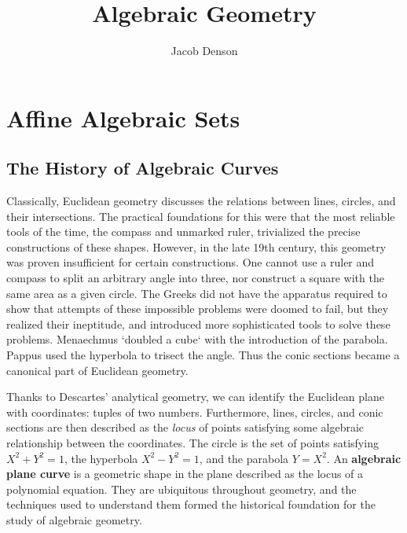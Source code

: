 

\title{Algebraic Geometry}
\author{Jacob Denson}



\maketitle
\tableofcontents
{}

\chapter{Affine Algebraic Sets}

\section{The History of Algebraic Curves}

Classically, Euclidean geometry discusses the relations between lines, circles, and their intersections. The practical foundations for this were that the most reliable tools of the time, the compass and unmarked ruler, trivialized the precise constructions of these shapes. However, in the late 19th century, this geometry was proven insufficient for certain constructions. One cannot use a ruler and compass to split an arbitrary angle into three, nor construct a square with the same area as a given circle. The Greeks did not have the apparatus required to show that attempts of these impossible problems were doomed to fail, but they realized their ineptitude, and introduced more sophisticated tools to solve these problems. Menaechmus `doubled a cube` with the introduction of the parabola. Pappus used the hyperbola to trisect the angle. Thus the conic sections became a canonical part of Euclidean geometry.

Thanks to Descartes' analytical geometry, we can identify the Euclidean plane with coordinates: tuples of two numbers. Furthermore, lines, circles, and conic sections are then described as the {\it locus} of points satisfying some algebraic relationship between the coordinates. The circle is the set of points satisfying $X^2 + Y^2 = 1$, the hyperbola $X^2 - Y^2 = 1$, and the parabola $Y = X^2$. An {\bf algebraic plane curve} is a geometric shape in the plane described as the locus of a polynomial equation. They are ubiquitous throughout geometry, and the techniques used to understand them formed the historical foundation for the study of algebraic geometry.

